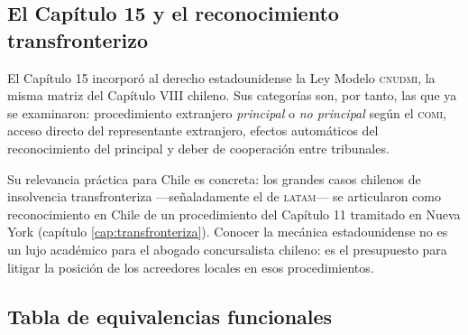 \subsection{El Capítulo 15 y el reconocimiento transfronterizo}

El Capítulo 15 incorporó al derecho estadounidense la Ley Modelo \textsc{cnudmi}, la misma matriz
del Capítulo VIII chileno. Sus categorías son, por tanto, las que ya se examinaron: procedimiento
extranjero \emph{principal} o \emph{no principal} según el \textsc{comi}, acceso directo del
representante extranjero, efectos automáticos del reconocimiento del principal y deber de
cooperación entre tribunales.

Su relevancia práctica para Chile es concreta: los grandes casos chilenos de insolvencia
transfronteriza ---señaladamente el de \textsc{latam}--- se articularon como reconocimiento en
Chile de un procedimiento del Capítulo 11 tramitado en Nueva York (capítulo
\ref{cap:transfronteriza}). Conocer la mecánica estadounidense no es un lujo académico para el
abogado concursalista chileno: es el presupuesto para litigar la posición de los acreedores locales
en esos procedimientos.

\bloquePractico

\subsection{Tabla de equivalencias funcionales}

